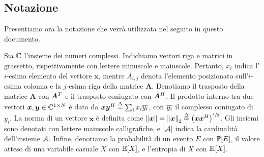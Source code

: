 \subsection*{Notazione}

Presentiamo ora la notazione che verrà utilizzata nel seguito in questo
documento.

Sia \(\mathbb{C}\) l'insieme dei numeri complessi. Indichiamo vettori riga e matrici in
grassetto, rispettivamente con lettere minuscole e maiuscole.  Pertanto,
\(x_i\) indica l'\(i\)-esimo elemento del vettore \(\bm{x}\), mentre
\(A_{i,j}\) denota l'elemento posizionato sull'\(i\)-esima colonna e la
\(j\)-esima riga della matrice \(\bm{A}\). Denotiamo il trasposto della matrice
\(\bm{A}\) con \(\bm{A}^{T}\) e il trasposto coniugato con \(\bm{A}^{H}\).  Il
prodotto interno tra due vettori \(\bm{x},\bm{y} \in \mathbb{C}^{1 \times N}\) è dato
da \(\bm{x}\bm{y}^{H} \overset{\Delta}{=} \sum_i x_i \overline{y_i}\), con \(\overline{y_i}\) il
complesso coniugato di \(y_i\). La norma di un vettore \(\bm{x}\) è definita
come \(\lnorm \bm{x} \rnorm = \lnorm \bm{x} \rnorm_2 \define
\mleft(\bm{x}\conjtran{x}\mright)^{\sfrac{1}{2}}\). Gli insiemi sono denotati
con lettere maiuscole calligrafiche, e \(\abs{\set{A}}\) indica la cardinalità
dell'insieme \(\mathcal{A}\). Infine, denotiamo la probabilità di un evento \(E\)
con \(\prob{E}\), il valore atteso di una variabile casuale \(X\) con
\(\expect{X}\), e l'entropia di \(X\) con \(\entropy{X}\).
